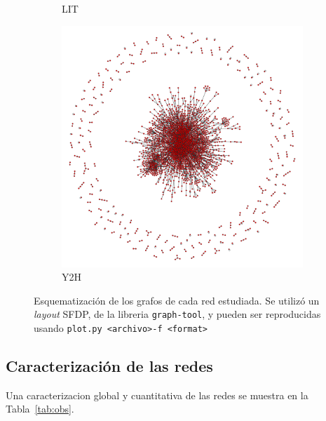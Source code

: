 \begin{figure}[!ht]
\begin{subfigure}[b]{0.30\columnwidth}
        \caption{\label{fig:LIT}LIT}
    \end{subfigure}
    \begin{subfigure}[b]{0.30\columnwidth}
        \includegraphics[width=\textwidth]{./schemes/yeast_Y2H-txt.pdf}
        \caption{\label{fig:y2h} Y2H}
    \end{subfigure}
    \caption{\label{fig:ej1_grafos} Esquematizaci\'on de los grafos de cada 
    red estudiada. Se utiliz\'o un \textit{layout} SFDP, de la libreria \texttt{graph-tool},
    y pueden ser reproducidas usando \texttt{plot.py~<archivo>\;\;-f <format>}    }
\end{figure}

\subsection{Caracterizaci\'on de las redes}
Una caracterizacion global y cuantitativa de las redes se muestra en la 
Tabla~\ref{tab:obs}. 



